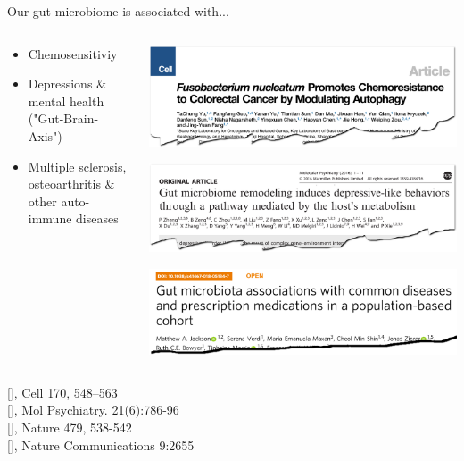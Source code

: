\documentclass[10pt]{beamer}
\newcommand{\credit}[1]{{\vspace{\fill} \par \raggedleft \scriptsize \mdseries \color{mDarkBrown} #1 \par}}
\newcommand{\citeme}[1]{{\xspace\color{scAqua} \scriptsize [\cite{#1}]}}
\begin{document}
\begin{frame}{Our gut microbiome is associated with...}
	\begin{columns}
		\begin{column}{0.4\textwidth}
			\begin{itemize}
				\item Chemosensitiviy
				\item Depressions \& mental health ("Gut-Brain-Axis")
				\item Multiple sclerosis, osteoarthritis  \& other auto-immune diseases
			\end{itemize}
		\end{column}
		\begin{column}{0.7\textwidth}
			\begin{center}
				\includegraphics[width=\textwidth]{./figures/microbiome-chemoresistance.png}\par
				\includegraphics[width=\textwidth]{./figures/gutbrainaxis-2-zhang.png}\par
				\includegraphics[width=\textwidth]{./figures/paper-jackson.png}
			\end{center}
		\end{column}
	\end{columns}
	\credit{
		\citeme{Yu2017}, Cell 170, 548–563 \\
		\citeme{Zheng2016}, Mol Psychiatry. 21(6):786-96 \\
		\citeme{Berer2011}, Nature 479, 538-542 \\
		\citeme{Jackson2018}, Nature Communications 9:2655}
\end{frame}
\end{document}
